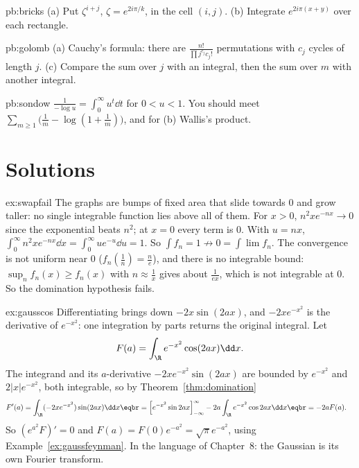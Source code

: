 \begin{hint}{pb:bricks}
(a) Put $\zeta^{i+j}$, $\zeta=e^{2i\pi/k}$, in the cell $(i,j)$. (b) Integrate $e^{2i\pi(x+y)}$ over each rectangle.
\end{hint}

\begin{hint}{pb:golomb}
(a) Cauchy's formula: there are $\frac{n!}{\prod j^{c_j}c_j!}$ permutations with $c_j$ cycles of length $j$. (c) Compare the sum
over $j$ with an integral, then the sum over $m$ with another integral.
\end{hint}

\begin{hint}{pb:sondow}
$\frac1{-\log u}=\int_0^\infty u^t\dd t$ for $0<u<1$. You should meet $\sum_{m\ge1}\bigl(\frac1m-\log(1+\frac1m)\bigr)$, and for (b) Wallis's product.
\end{hint}

\section{Solutions}

\begin{solution}{ex:swapfail}
\idea The graphs are bumps of fixed area that slide towards $0$ and grow taller: no single integrable function lies above all
of them.
\writeup For $x>0$, $n^2xe^{-nx}\to0$ since the exponential beats $n^2$; at $x=0$ every term is $0$. With $u=nx$,
$\int_0^\infty n^2xe^{-nx}\dd x=\int_0^\infty ue^{-u}\dd u=1$. So $\int f_n=1\not\to0=\int\lim f_n$. The convergence is not uniform near $0$
($f_n(\frac1n)=\frac ne$), and there is no integrable bound: $\sup_nf_n(x)\ge f_n(x)$ with $n\approx\frac1x$ gives about $\frac1{ex}$, which
is not integrable at $0$. So the domination hypothesis fails.
\end{solution}

\begin{solution}{ex:gausscos}
\idea Differentiating brings down $-2x\sin(2ax)$, and $-2xe^{-x^2}$ is the derivative of $e^{-x^2}$: one integration by parts returns
the original integral.
\writeup Let
\[
F(a)=\int_{\R}e^{-x^2}\cos(2ax)\dd x.
\]
The integrand and its $a$-derivative $-2xe^{-x^2}\sin(2ax)$ are bounded by $e^{-x^2}$
and $2|x|e^{-x^2}$, both integrable, so by Theorem~\ref{thm:domination}
\[
\begin{aligned}F'(a)&=\int_{\R}(-2xe^{-x^2})\sin(2ax)\dd x\eqbr=\Bigl[e^{-x^2}\sin2ax\Bigr]_{-\infty}^\infty-2a\int_{\R}e^{-x^2}\cos2ax\dd x\eqbr=-2aF(a).\end{aligned}
\]
So $(e^{a^2}F)'=0$ and $F(a)=F(0)e^{-a^2}=\sqrt\pi e^{-a^2}$, using Example~\ref{ex:gaussfeynman}. In the language of Chapter~8: the
Gaussian is its own Fourier transform.
\end{solution}

